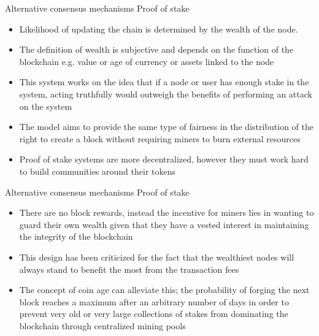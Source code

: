 \documentclass[11pt]{beamer}
\begin{document}

\begin{frame}{Alternative consensus mechanisms}
	Proof of stake
	\begin{itemize}
		\item Likelihood of updating the chain is determined by the wealth of the node.
		\item The definition of wealth is subjective and depends on the function of the blockchain e.g. value or age of currency or assets linked to the node
		\item This system works on the idea that if a node or user has enough stake in the system, acting truthfully would outweigh the benefits of performing an attack on the system
		\item The model aims to provide the same type of fairness in the distribution of the right to create a block without requiring miners to burn external resources
		\item Proof of stake systems are more decentralized, however they must work hard to build communities around their tokens
	\end{itemize}
\end{frame}


\begin{frame}{Alternative consensus mechanisms}
	Proof of stake
	\begin{itemize}
		\item There are no block rewards, instead the incentive for miners lies in wanting to guard their own wealth given that they have a vested interest in maintaining the integrity of the blockchain
		\item This design has been criticized for the fact that the wealthiest nodes will always stand to benefit the most from the transaction fees
		\item The concept of coin age can alleviate this; the probability of forging the next block reaches a maximum after an arbitrary number of days in order to prevent very old or very large collections of stakes from dominating the blockchain through centralized mining pools
	\end{itemize}
\end{frame}

\end{document}
